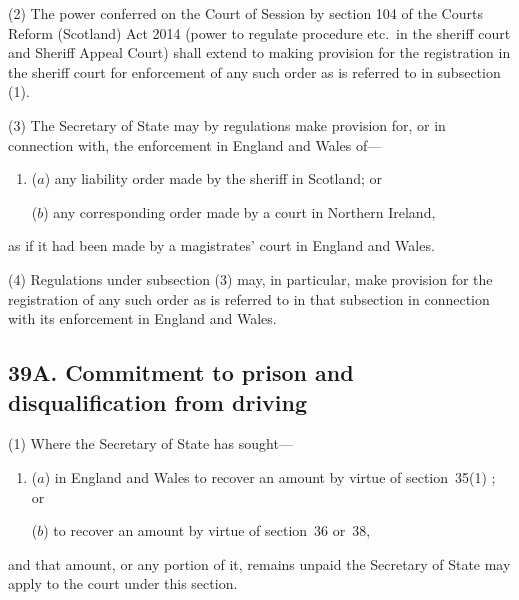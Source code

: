 \documentclass[12pt,a4paper]{article}
\begin{document}
(2) The power conferred on the Court of Session by 
section 104 of the Courts Reform (Scotland) Act 2014 (power to regulate procedure etc.\ in the sheriff court and Sheriff Appeal Court)  %
shall extend to making provision for the registration in the sheriff court for enforcement of any such order as is referred to in subsection (1).

(3) The Secretary of State may by regulations make provision for, or in connection with, the enforcement in England and Wales of—
\begin{enumerate}\item[]
($a$) any liability order made by the sheriff in Scotland; or

($b$) any corresponding order made by a court in Northern Ireland,
\end{enumerate}
as if it had been made by a magistrates' court in England and Wales.

(4) Regulations under subsection (3)  may, in particular, make provision for the registration of any such order as is referred to in that subsection in connection with its enforcement in England and Wales.


\subsection[39A. Commitment to prison and disqualification from driving]{\sloppy 39A. Commitment to prison and disqualification from driving}

(1) Where the 
Secretary of State  %
has sought—
\begin{enumerate}\item[]
($a$) in England and Wales to 
recover an amount by virtue of section~35(1)%
; or

($b$) to recover an amount by virtue of section~36 or~38,
\end{enumerate}
and that amount, or any portion of it, remains unpaid 
the Secretary of State  %
may apply to the court under this section.
\end{document}
